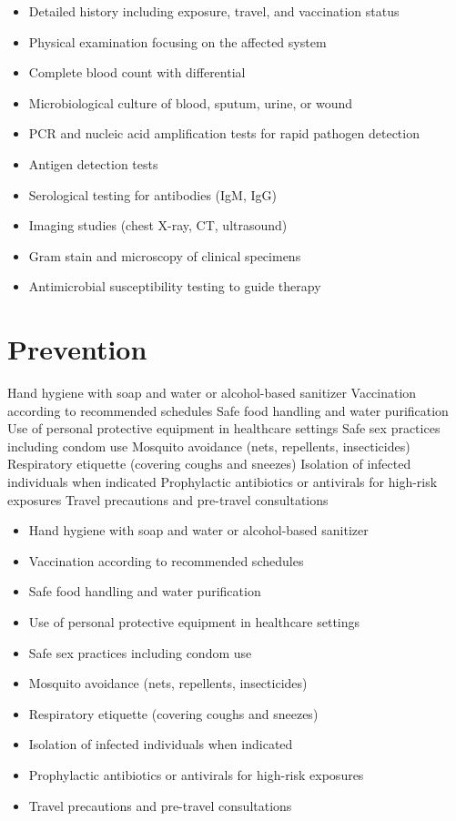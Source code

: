 \begin{itemize}[noitemsep]
  \item Detailed history including exposure, travel, and vaccination status
  \item Physical examination focusing on the affected system
  \item Complete blood count with differential
  \item Microbiological culture of blood, sputum, urine, or wound
  \item PCR and nucleic acid amplification tests for rapid pathogen detection
  \item Antigen detection tests
  \item Serological testing for antibodies (IgM, IgG)
  \item Imaging studies (chest X-ray, CT, ultrasound)
  \item Gram stain and microscopy of clinical specimens
  \item Antimicrobial susceptibility testing to guide therapy
\end{itemize}
\section{Prevention}
Hand hygiene with soap and water or alcohol-based sanitizer Vaccination according to recommended schedules Safe food handling and water purification Use of personal protective equipment in healthcare settings Safe sex practices including condom use Mosquito avoidance (nets, repellents, insecticides) Respiratory etiquette (covering coughs and sneezes) Isolation of infected individuals when indicated Prophylactic antibiotics or antivirals for high-risk exposures Travel precautions and pre-travel consultations

\begin{itemize}[noitemsep]
  \item Hand hygiene with soap and water or alcohol-based sanitizer
  \item Vaccination according to recommended schedules
  \item Safe food handling and water purification
  \item Use of personal protective equipment in healthcare settings
  \item Safe sex practices including condom use
  \item Mosquito avoidance (nets, repellents, insecticides)
  \item Respiratory etiquette (covering coughs and sneezes)
  \item Isolation of infected individuals when indicated
  \item Prophylactic antibiotics or antivirals for high-risk exposures
  \item Travel precautions and pre-travel consultations
\end{itemize}
